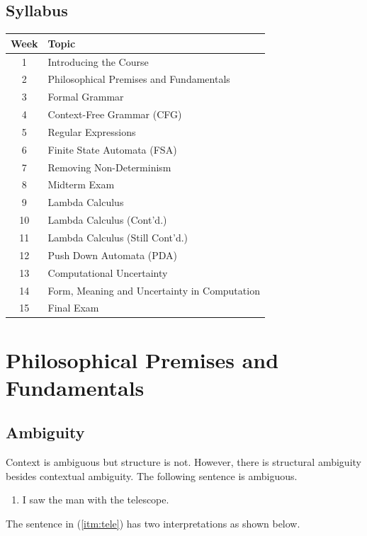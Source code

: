 \documentclass[12pt,a4paper]{article}
\begin{document}
\subsection{Syllabus}
\begin{table}[H]
\renewcommand{\arraystretch}{1.5}
\begin{tabular}{|c l|}
\hline
Week & Topic                                   \\ \hline
1    & Introducing the Course                  \\ \hline
2    & Philosophical Premises and Fundamentals \\ \hline
3    & Formal Grammar                          \\ \hline
4    & Context-Free Grammar (CFG)              \\ \hline
5    & Regular Expressions                     \\ \hline
6    & Finite State Automata (FSA)             \\ \hline
7    & Removing Non-Determinism                \\ \hline
8    & Midterm Exam                            \\ \hline
9    & Lambda Calculus                         \\ \hline
10   & Lambda Calculus (Cont'd.)               \\ \hline
11   & Lambda Calculus (Still Cont'd.)         \\ \hline
12   & Push Down Automata (PDA)                \\ \hline
13   & Computational Uncertainty               \\ \hline
14   & Form, Meaning and Uncertainty in Computation               \\ \hline
15   & Final Exam                              \\ \hline
\end{tabular}
\end{table}
\clearpage

\section{Philosophical Premises and Fundamentals}
\subsection{Ambiguity}
Context is ambiguous but structure is not. However, there is structural ambiguity besides contextual ambiguity. The following sentence is ambiguous.
\begin{enumerate}
\item I saw the man with the telescope.\label{itm:tele}
\end{enumerate}
The sentence in (\ref{itm:tele}) has two interpretations as shown below.\\
\end{document}

